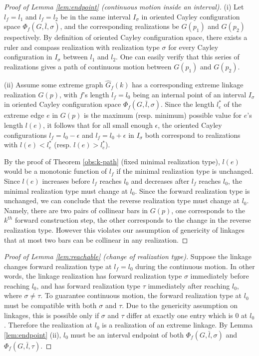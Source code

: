 \documentclass[secthm,amsthm,english]{article}
\theoremstyle{definition}
\theoremstyle{remark}
\begin{document}
\begin{proof}[Proof of Lemma \ref{lem:endpoint} (continuous motion inside an interval)]
\noindent (i) 
Let $l_f = l_1$ and $l_f = l_2$ be in the same interval $I_\sigma$ in oriented Cayley configuration space $\Phi_f(G, \bar{l}, \sigma)$, and the corresponding realizations be $G(p_1)$ and $G(p_2)$ respectively. 
By definition of oriented Cayley configuration space,  
there exists a ruler and compass realization with realization type $\sigma$ for
every Cayley configuration in $I_\sigma$ between $l_1$ and $l_2$.
One can easily verify that this series of realizations gives a path of continuous motion between $G(p_1)$ and $G(p_2)$. 


\noindent (ii) Assume some extreme graph $\hat{G}_f(k)$ has a corresponding extreme linkage realization $G(p)$, 
with $f$'s length $l_f = l_0$ being an internal point of an interval $I_\sigma$ in oriented Cayley configuration space $\Phi_f(G, \bar{l}, \sigma)$.
Since the length $l_e^*$ of the extreme edge $e$ in $G(p)$ is the maximum (resp. minimum) possible value for $e$'s length $l(e)$, 
it follows that for all small enough $\epsilon$, the oriented Cayley configurations $l_f = l_0 - \epsilon$ and $l_f = l_0 + \epsilon$ in $I_\sigma$ both correspond to realizations with $l(e) < l_e^*$ (resp. $l(e)>l_e^*$). 

By the proof of Theorem \ref{obs:k-path} (fixed minimal realization type), $l(e)$  would be a monotonic function of $l_f$ if the minimal realization type is unchanged.
Since $l(e)$ increases before $l_f$ reaches $l_0$ and decreases after $l_f$ reaches $l_0$, 
the minimal realization type must change at $l_0$. 
Since the forward realization type is unchanged, 
we can conclude that the reverse realization type must change at $l_0$. 
Namely, there are two pairs of collinear bars in $G(p)$, 
one corresponds to the $k^{th}$ forward construction step, the other corresponds to the change in the reverse realization type. 
However this violates our assumption of genericity of linkages that  at most two bars can be collinear in any realization. 
\end{proof}

\begin{proof}[Proof of Lemma \ref{lem:reachable} (change of realization type)]
Suppose the linkage changes forward realization type at $l_f = l_0$ during the continuous motion. 
In other words, the linkage realization has forward realization type $\sigma$ immediately before reaching $l_0$,
and has forward realization type $\tau$ immediately after reaching $l_0$, where $\sigma \ne \tau$. 
To guarantee continuous motion, the forward realization type at $l_0$ must be compatible with both $\sigma$ and $\tau$. 
Due to the genericity assumption on linkages, 
this is possible only if $\sigma$ and $\tau$ differ at exactly one entry which is $0$ at $l_0$. 
Therefore the realization at $l_0$ is a realization of an extreme linkage. 
By Lemma \ref{lem:endpoint} (ii), $l_0$ must be an interval endpoint of both $\Phi_f(G, \bar{l},\sigma)$ and $\Phi_f(G, \bar{l},\tau)$.
\end{proof}
\end{document}

